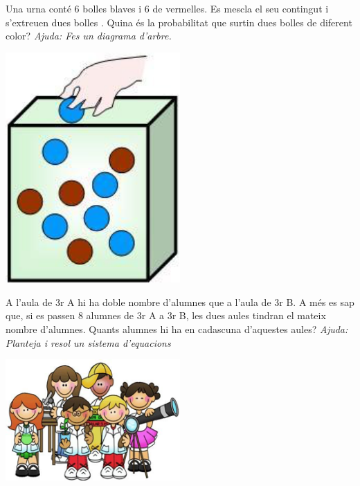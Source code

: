 \begin{mylist}
	
 \vspace{-1.5cm}
 \exer[2] \begin{minipage}[t]{0.7\textwidth}
 	Una urna conté 6 bolles blaves i 6 de vermelles. Es mescla el seu contingut i s'extreuen dues bolles \textbf{}. Quina és la probabilitat que surtin dues bolles de diferent color? \textit{Ajuda: Fes un diagrama d'arbre.}
 \end{minipage}
 \begin{minipage}{0.3\textwidth}
 	\centering
 	\vspace{1.5cm}
 	\includegraphics[width=0.5\textwidth]{img-12/image5}
 \end{minipage}
	
	  
	\vspace{-1.5cm}
	\exer[2] \begin{minipage}[t]{0.7\textwidth}
		 A l'aula de 3r A hi ha doble nombre d'alumnes que a l'aula de 3r B. A més es sap que, si es passen 8 alumnes de 3r A a 3r B, les dues aules tindran el mateix nombre d'alumnes. Quants alumnes hi ha en cadascuna d'aquestes aules? \textit{Ajuda: Planteja i resol un sistema d'equacions}
	\end{minipage}
	\begin{minipage}{0.3\textwidth}
		\centering
		\vspace{1.5cm}
		\includegraphics[width=0.5\textwidth]{img-12/image6}
	\end{minipage}
	

\end{mylist}
